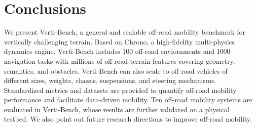\section{Conclusions}
\label{sec::conclusions}

We present Verti-Bench, a general and scalable off-road mobility benchmark for vertically challenging terrain. Based on Chrono, a high-fidelity multi-physics dynamics engine, Verti-Bench includes 100 off-road enviornments and 1000 navigation tasks with millions of off-road terrain features covering geometry, semantics, and obstacles. Verti-Bench can also scale to off-road vehicles of different sizes, weights, chassis, suspensions, and steering mechanisms. Standardized metrics and datasets are provided to quantify off-road mobility performance and facilitate data-driven mobility. Ten off-road mobility systems are evaluated in Verti-Bench, whose results are further validated on a physical testbed. We also point out future research directions to improve off-road mobility. 
